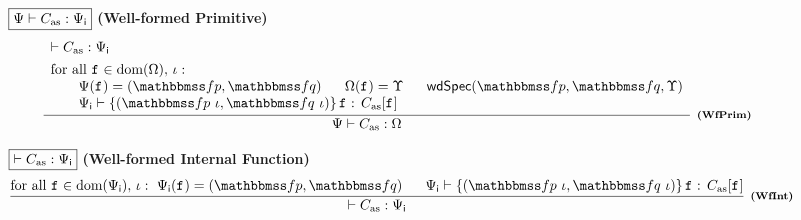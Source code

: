 \begin{figure*}
    \centering
    \subfigure
    {
        \begin{minipage}{1\linewidth}
            $\boxed{{\Psi} \vdash {C_{\text{as}}} : {\Psi_{\textsf{i}}}}$ \quad\quad
            \textbf{(Well-formed Primitive)}
            \[
				\infer[\tinybftext{(WfPrim)}]
				{
					\wfprim{\Cspec}{\asmimp}{\hprimset}
				}
				{
                    \begin{array}{l}
                        \wfcdhp{\asmimp}{\intSpec} \\
                        \\[-8pt]
                        \TYPE{for all } \lab{} \in \dom(\hprimset), \, 
                        	\lgvl: \\
                        \qquad
                        \Cspec(\lab{}) = (\relspecpre, \relspecpost)
                        \quad \ \ 
                        \hprimset(\lab{}) = \hprim \quad \ \ 
                        \wdSpec{\relspecpre}{\relspecpost}
                        	{\hprim} 
                        \\
                        \qquad
                        \wdcblk{\intSpec}{\relspecpre \ \lgvl}
                            {\relspecpost \ \lgvl}{\lab{}}{\asmimp[\lab{}]}
                    \end{array}
				}
			\]
		\end{minipage}
    }

    \subfigure
    {
        \begin{minipage}{1\textwidth}
            $\boxed{\vdash {C_{\text{as}}} : {\Psi_{\textsf{i}}}}$ \qquad
            \textbf{(Well-formed Internal Function)}
            \[
                \infer[\tinybftext{(WfInt)}]
                {
                    \wfcdhp{\asmimp}{\intSpec}
                }
                {
                    \TYPE{for all } \lab{} \in \dom(\intSpec), \, 
                    \lgvl : \ 
                    \intSpec(\lab{}) = (\relspecpre, \relspecpost) 
                    \quad \ \ 
                    \wdcblk{\intSpec}{\relspecpre \ \lgvl}
                        {\relspecpost \ \lgvl}{\lab{}}
                        {\asmimp[\lab{}]}
                }
            \]
        \end{minipage}
    }


\end{figure*}
